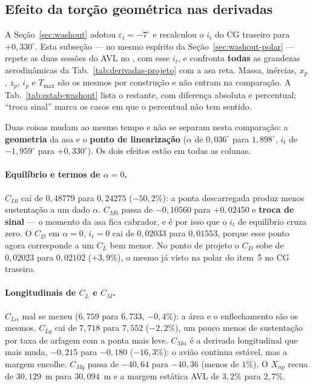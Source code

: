 \subsection{Efeito da torção geométrica nas derivadas}
\label{sec:estab-washout}

A Seção~\ref{sec:washout} adotou $\varepsilon_t = -7^\circ$ e recalculou
o $i_t$ do CG traseiro para $+0{,}330^\circ$. Esta subseção --- no mesmo
espírito da Seção~\ref{sec:washout-polar} --- repete as duas sessões do AVL
no , com esse $i_t$, e confronta \textbf{todas} as
grandezas aerodinâmicas da Tab.~\ref{tab:derivadas-projeto} com a asa reta.
Massa, inércias, $x_p$, $z_p$, $i_p$ e $T_{\max}$ são os mesmos por
construção e não entram na comparação. A Tab.~\ref{tab:estab-washout} lista
o restante, com diferença absoluta e percentual; ``troca sinal'' marca os
casos em que o percentual não tem sentido.

Duas coisas mudam ao mesmo tempo e não se separam nesta comparação: a
\textbf{geometria} da asa e o \textbf{ponto de linearização} ($\alpha$ de
$0{,}036^\circ$ para $1{,}898^\circ$, $i_t$ de $-1{,}959^\circ$ para
$+0{,}330^\circ$). Os dois efeitos estão em todas as colunas.

\begin{table}[H]
\centering
\caption{Comparação completa das grandezas aerodinâmicas da Seção~3, CG
traseiro: asa reta () versus $\varepsilon_t = -7^\circ$
(). A tabela oficial do MVFO continua sendo a da asa
reta.}
\label{tab:estab-washout}
\scriptsize

\end{table}

\paragraph{Equilíbrio e termos de $\alpha=0$.}
$C_{L0}$ cai de $0{,}48779$ para $0{,}24275$ ($-50{,}2$\%): a ponta
descarregada produz menos sustentação a um dado $\alpha$. $C_{M0}$ passa de
$-0{,}10560$ para $+0{,}02450$ e \textbf{troca de sinal} --- o momento da
asa fica cabrador, e é por isso que o $i_t$ de equilíbrio cruza zero. O
$C_D$ em $\alpha=0$, $i_t=0$ cai de $0{,}02033$ para $0{,}01553$, porque
esse ponto agora corresponde a um $C_L$ bem menor. No ponto de projeto o
$C_D$ sobe de $0{,}02023$ para $0{,}02102$ ($+3{,}9$\%), o mesmo já visto
na polar do item~5 no CG traseiro.

\paragraph{Longitudinais de $C_L$ e $C_M$.}
$C_{L\alpha}$ mal se mexeu ($6{,}759$ para $6{,}733$, $-0{,}4$\%): a área e
o enflechamento são os mesmos. $C_{Lq}$ cai de $7{,}718$ para $7{,}552$
($-2{,}2$\%), um pouco menos de sustentação por taxa de arfagem com a ponta
mais leve. $C_{M\alpha}$ é a derivada longitudinal que mais muda,
$-0{,}215$ para $-0{,}180$ ($-16{,}3$\%): o avião continua estável, mas a
margem encolhe. $C_{Mq}$ passa de $-40{,}64$ para $-40{,}36$ (menos de
$1$\%). O $X_{np}$ recua de $30{,}129$~m para $30{,}094$~m e a margem
estática AVL de $3{,}2$\% para $2{,}7$\%.

